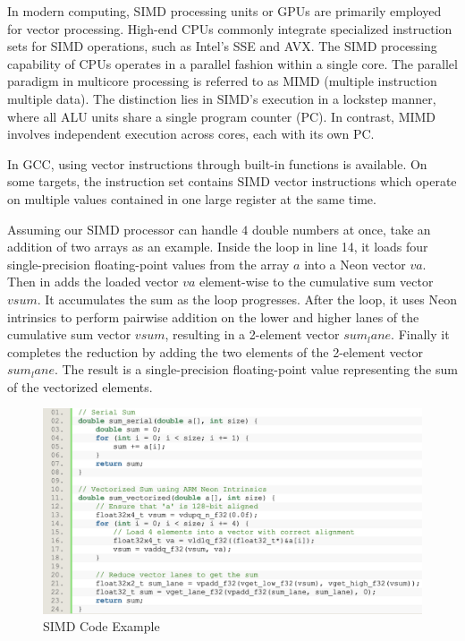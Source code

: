 \documentclass[conference]{IEEEtran}
\begin{document}
In modern computing, SIMD processing units or GPUs are primarily employed for vector processing. High-end CPUs commonly integrate specialized instruction sets for SIMD operations, such as Intel's SSE and AVX. The SIMD processing capability of CPUs operates in a parallel fashion within a single core. The parallel paradigm in multicore processing is referred to as MIMD (multiple instruction multiple data). The distinction lies in SIMD's execution in a lockstep manner, where all ALU units share a single program counter (PC). In contrast, MIMD involves independent execution across cores, each with its own PC.

In GCC, using vector instructions through built-in functions is available. On some targets, the instruction set contains SIMD vector instructions which operate on multiple values contained in one large register at the same time.\cite{b6}

Assuming our SIMD processor can handle $4$ double numbers at once, take an addition of two arrays as an example. Inside the loop in line 14, it loads four single-precision floating-point values from the array $a$ into a Neon vector $va$. Then in adds the loaded vector $va$ element-wise to the cumulative sum vector $vsum$. It accumulates the sum as the loop progresses. After the loop, it uses Neon intrinsics to perform pairwise addition on the lower and higher lanes of the cumulative sum vector $vsum$, resulting in a 2-element vector $sum_lane$. Finally it completes the reduction by adding the two elements of the 2-element vector $sum_lane$. The result is a single-precision floating-point value representing the sum of the vectorized elements.

\begin{figure}[htbp]
\centering
\includegraphics [width=0.95\linewidth]{pictures/SIMD_code.png}
\caption{SIMD Code Example}
\label{fig8}
\end{figure}
\end{document}

